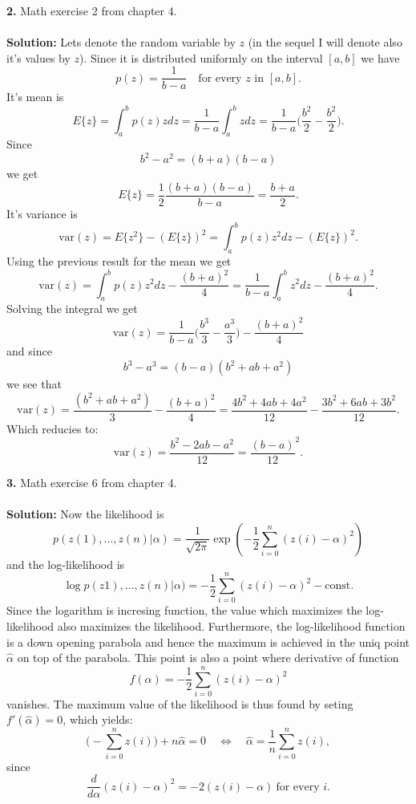 \documentclass[10pt,a4paper]{amsart}
\newenvironment{tehtratk}%
             {\begin{list}{\arabic{enumi}.}{\usecounter{enumi}%
              \setlength{\labelsep}{0.5em}%
              \settowidth{\labelwidth}{\arabic{enumi}.}%
              \setlength{\leftmargin}{\labelwidth+\labelsep}}}%
             {\end{list}}
\begin{document}
\begin{tehtratk}
\item[\textbf{2.}] Math exercise 2 from chapter 4.\\
\\
\textbf{Solution:} Lets denote the random variable by $z$ (in the sequel I will
denote also it's values by $z$). Since it is distributed uniformly on the
interval $[a, b]$ we have
\[
p(z) = \frac{1}{b - a} \quad \text{for every $z$ in $[a, b]$}.
\]
It's mean is
\[
E\{z\} = \int_a^b p(z)zdz = \frac{1}{b - a}\int_a^b zdz =
\frac{1}{b - a}\Big(\frac{b^2}{2} - \frac{b^2}{2}\Big).
\]
Since
\[
b^2 - a^2 = (b + a)(b - a)
\]
we get
\[
E\{z\} =
\frac{1}{2}\frac{(b + a)(b - a)}{b - a} = \frac{b + a}{2}.
\]
It's variance is
\[
\text{var}(z) = E\{z^2\} - (E\{z\})^2 = \int_a^b p(z)z^2dz  - (E\{z\})^2.
\]
Using the previous result for the mean we get
\[
\text{var}(z) = \int_a^b p(z)z^2dz  - \frac{(b + a)^2}{4} =
\frac{1}{b - a}\int_a^b z^2dz - \frac{(b + a)^2}{4}.
\]
Solving the integral we get
\[
\text{var}(z) =
\frac{1}{b - a}\Big(\frac{b^3}{3} - \frac{a^3}{3}\Big)- \frac{(b + a)^2}{4}
\]
and since
\[
b^3 - a^3 = (b -a)(b^2 + ab + a^2)
\]
we see that
\[
\text{var}(z) = \frac{(b^2 + ab + a^2)}{3} - \frac{(b + a)^2}{4}
= \frac{4b^2 + 4ab + 4a^2}{12} -\frac{3b^2 + 6ab + 3b^2}{12}.\]
Which reducies to:
\[
\text{var}(z) = \frac{b^2 - 2ab - a^2}{12} = \frac{(b - a)}{12}^2.
\]
\vspace{0.3cm}
\item[\textbf{3.}] Math exercise 6 from chapter 4.\\
\\
\textbf{Solution:} Now the likelihood is
\[
p(z(1), \ldots , z(n)|\alpha) =
\frac{1}{\sqrt{2 \pi}}\exp(-\frac{1}{2}\sum_{i = 0}^n(z(i) - \alpha)^2)
\]
and the log-likelihood is
\[
\log p(z1), \ldots , z(n)|\alpha) =
-\frac{1}{2}\sum_{i = 0}^n(z(i) - \alpha)^2 - \text{const.}
\]
Since the logarithm is incresing function, the value which maximizes the
log-likelihood also maximizes the likelihood. Furthermore, the log-likelihood
function is a down opening parabola and hence the maximum is achieved in the
uniq point $\hat{\alpha}$ on top of the parabola. This point is also a point
where derivative of function
\[f(\alpha) = -\frac{1}{2}\sum_{i = 0}^n(z(i) - \alpha)^2\]
vanishes.
The maximum value of the likelihood is thus found by seting
$f'(\hat{\alpha}) = 0$, which yields:
\[
\big(-\sum_{i = 0}^n z(i)\big) + n\hat{\alpha} = 0
\quad \Leftrightarrow \quad \hat{\alpha} = \frac{1}{n}\sum_{i = 0}^n z(i),
\]
since
\[
\frac{d}{d\alpha}(z(i) - \alpha)^2 = -2(z(i) -\alpha) \ \text{for every $i$.}
\]
\end{tehtratk}
\end{document}
